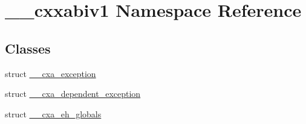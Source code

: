 \hypertarget{namespace____cxxabiv1}{\section{\-\_\-\-\_\-cxxabiv1 Namespace Reference}
\label{namespace____cxxabiv1}
}
\subsection*{Classes}
\begin{DoxyCompactItemize}
\item 
struct \hyperlink{struct____cxxabiv1_1_1____cxa__exception}{\-\_\-\-\_\-cxa\-\_\-exception}
\item 
struct \hyperlink{struct____cxxabiv1_1_1____cxa__dependent__exception}{\-\_\-\-\_\-cxa\-\_\-dependent\-\_\-exception}
\item 
struct \hyperlink{struct____cxxabiv1_1_1____cxa__eh__globals}{\-\_\-\-\_\-cxa\-\_\-eh\-\_\-globals}
\end{DoxyCompactItemize}
